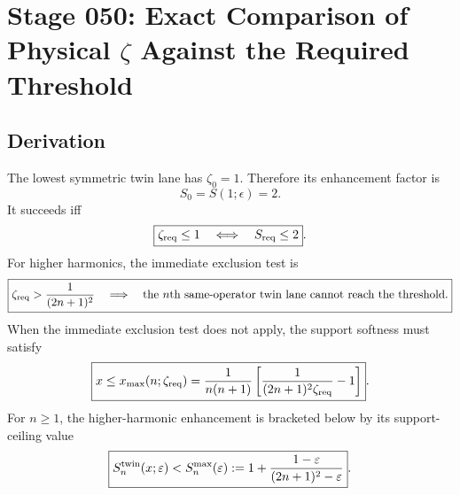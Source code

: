 \section[Stage 050]{Stage 050: Exact Comparison of Physical \texorpdfstring{$\zeta$}{zeta} Against the Required Threshold}
\label{stage:050}



\subsection*{Derivation}

The lowest symmetric twin lane has \(\zeta_0=1\).  Therefore its enhancement factor is
\begin{equation}
\label{eq:app-stage050-S0}
\boxed{
S_0=S(1;\epsilon)=2}.
\end{equation}
It succeeds iff
\begin{equation}
\label{eq:app-stage050-lowest-success}
\boxed{
\zeta_{\rm req}\leq1
\quad\Longleftrightarrow\quad
S_{\rm req}\leq2}.
\end{equation}
For higher harmonics, the immediate exclusion test is
\begin{equation}
\label{eq:app-stage050-higher-bound}
\boxed{
\zeta_{\rm req}>\frac{1}{(2n+1)^2}
\quad\Longrightarrow\quad
\text{the }n\text{th same-operator twin lane cannot reach the threshold.}
}
\end{equation}
When the immediate exclusion test does not apply, the support softness must satisfy
\begin{equation}
\label{eq:app-stage050-xmax}
\boxed{
x\leq x_{\max}(n;\zeta_{\rm req})
=\frac{1}{n(n+1)}\left[\frac{1}{(2n+1)^2\zeta_{\rm req}}-1\right]}.
\end{equation}
For \(n\ge 1\), the higher-harmonic enhancement is bracketed below by its support-ceiling value
\begin{equation}
\label{eq:app-stage050-Sn-max}
\boxed{
S_n^{\rm twin}(x;\varepsilon) < S_n^{\rm max}(\varepsilon)
:= 1 + \frac{1-\varepsilon}{(2n+1)^2-\varepsilon}}.
\end{equation}

